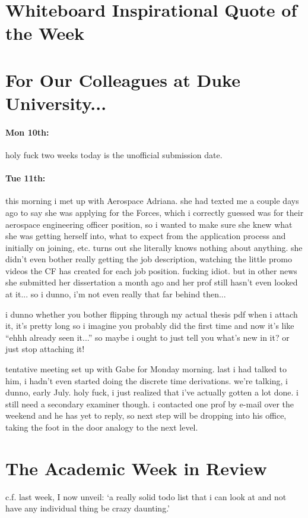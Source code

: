 \documentclass[12pt]{article}
\begin{document}
\newpage
\section*{Whiteboard Inspirational Quote of the Week}

\section*{For Our Colleagues at Duke University...}
\paragraph{Mon 10th:} holy fuck two weeks today is the unofficial submission date. 

\paragraph{Tue 11th:} this morning i met up with Aerospace Adriana. she had texted me a couple days ago to say she was applying for the Forces, which i correctly guessed was for their aerospace engineering officer position, so i wanted to make sure she knew what she was getting herself into, what to expect from the application process and initially on joining, etc. turns out she literally knows nothing about anything. she didn't even bother really getting the job description, watching the little promo videos the CF has created for each job position. fucking idiot. but in other news she submitted her dissertation a month ago and her prof still hasn't even looked at it... so i dunno, i'm not even really that far behind then... \par 
i dunno whether you bother flipping through my actual thesis pdf when i attach it, it's pretty long so i imagine you probably did the first time and now it's like ``ehhh already seen it...'' so maybe i ought to just tell you what's new in it? or just stop attaching it! \par 
tentative meeting set up with Gabe for Monday morning. last i had talked to him, i hadn't even started doing the discrete time derivations. we're talking, i dunno, early July. holy fuck, i just realized that i've actually gotten a lot done. i still need a secondary examiner though. i contacted one prof by e-mail over the weekend and he has yet to reply, so next step will be dropping into his office, taking the foot in the door analogy to the next level. 

\section*{The Academic Week in Review}
c.f. last week, I now unveil: `a really solid todo list that i can look at and not have any individual thing be crazy daunting.'
\end{document}
